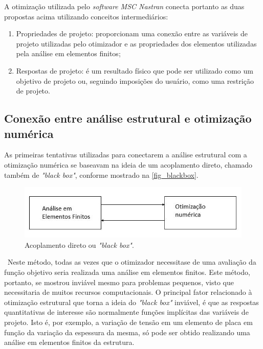A otimização utilizada pelo \emph{software MSC Nastran} conecta portanto as duas propostas acima utilizando conceitos intermediários:
\begin{enumerate}
\item Propriedades de projeto: proporcionam uma conexão entre as variáveis de projeto utilizadas pelo otimizador e as propriedades dos elementos utilizadas pela análise em elementos finitos;
\item Respostas de projeto: é um resultado físico que pode ser utilizado como um objetivo de projeto ou, seguindo imposições do usuário, como uma restrição de projeto.
\end{enumerate}

\subsection{Conexão entre análise estrutural e otimização numérica}
As primeiras tentativas utilizadas para conectarem a análise estrutural com a otimização numérica se baseavam na ideia de um acoplamento direto, chamado também de \emph{"black box"}, conforme mostrado na \autoref{fig_blackbox}.

\begin{figure}[h]
	\caption{\label{fig_blackbox}Acoplamento direto ou \emph{"black box"}.}
  \centering
  \includegraphics[scale=0.7]{figura/blackbox}
\end{figure}

\
Neste método, todas as vezes que o otimizador necessitase de uma avaliação da função objetivo seria realizada uma análise em elementos finitos. Este método, portanto, se mostrou inviável mesmo para problemas pequenos, visto que necessitaria de muitos recursos computacionais. O principal fator relacionado à otimização estrutural que torna a ideia do \emph{"black box"} inviável, é que as respostas quantitativas de interesse são normalmente funções implícitas das variáveis de projeto. Isto é, por exemplo, a variação de tensão em um elemento de placa em função da variação da espessura da mesma, só pode ser obtido realizando uma análise em elementos finitos da estrutura.

